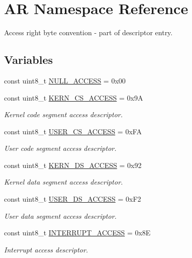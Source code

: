 \hypertarget{namespace_a_r}{}\section{AR Namespace Reference}
\label{namespace_a_r}


Access right byte convention -\/ part of descriptor entry.  


\subsection*{Variables}
\begin{DoxyCompactItemize}
\item 
const uint8\+\_\+t \hyperlink{namespace_a_r_a5441c70c25fc8a59482c6b49eb5263fd}{N\+U\+L\+L\+\_\+\+A\+C\+C\+E\+SS} = 0x00
\item 
const uint8\+\_\+t \hyperlink{namespace_a_r_a522bab0f6835eb217d6da7dc243cb321}{K\+E\+R\+N\+\_\+\+C\+S\+\_\+\+A\+C\+C\+E\+SS} = 0x9A
\begin{DoxyCompactList}\small\item\em Kernel code segment access descriptor. \end{DoxyCompactList}\item 
const uint8\+\_\+t \hyperlink{namespace_a_r_af35b80337e742e9605c8b3a863889545}{U\+S\+E\+R\+\_\+\+C\+S\+\_\+\+A\+C\+C\+E\+SS} = 0x\+FA
\begin{DoxyCompactList}\small\item\em User code segment access descriptor. \end{DoxyCompactList}\item 
const uint8\+\_\+t \hyperlink{namespace_a_r_adc3973813b32aa819be54d431f1bdb24}{K\+E\+R\+N\+\_\+\+D\+S\+\_\+\+A\+C\+C\+E\+SS} = 0x92
\begin{DoxyCompactList}\small\item\em Kernel data segment access descriptor. \end{DoxyCompactList}\item 
const uint8\+\_\+t \hyperlink{namespace_a_r_a1b8796b06b020a1610233d041b60e101}{U\+S\+E\+R\+\_\+\+D\+S\+\_\+\+A\+C\+C\+E\+SS} = 0x\+F2
\begin{DoxyCompactList}\small\item\em User data segment access descriptor. \end{DoxyCompactList}\item 
const uint8\+\_\+t \hyperlink{namespace_a_r_a22cf15841ad21a98049a02bf139f5d90}{I\+N\+T\+E\+R\+R\+U\+P\+T\+\_\+\+A\+C\+C\+E\+SS} = 0x8E
\begin{DoxyCompactList}\small\item\em Interrupt access descriptor. \end{DoxyCompactList}\end{DoxyCompactItemize}


